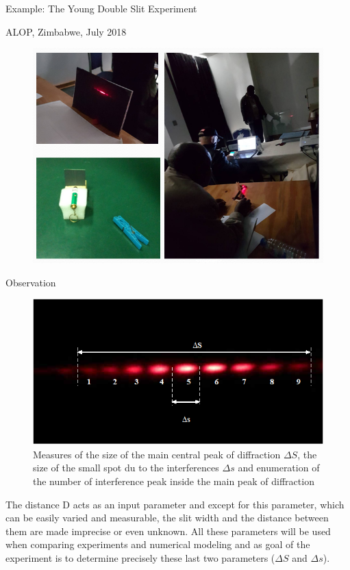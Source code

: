 \documentclass[serif ,mathserif, 8pt]{beamer}
\begin{document}
\begin{frame}{Example: The Young Double Slit Experiment}
	\begin{block}{ALOP, Zimbabwe, July 2018}
		\centering
		\begin{figure}
			\includegraphics[width=.7\linewidth]{images/alop2018}
		\end{figure}
	\end{block}
\end{frame}
\begin{frame}{Observation}
	\centering
	\begin{figure}
		\includegraphics[width=.7\linewidth]{images/Image1}
		\caption{Measures of the size of the main central peak of diffraction $\Delta S$, the size of the small spot du to the interferences $\Delta s$ and enumeration of the number of interference peak inside the main peak of diffraction
		}
	\end{figure}
The distance D acts as an input parameter and except for this parameter, which can be easily varied and measurable, the slit width and the distance between them are made imprecise or even unknown. All these parameters will be used when comparing experiments and numerical modeling and as goal of the experiment is to determine precisely these last two parameters ($\Delta S$ and $\Delta s$). 

\end{frame}
\end{document}
